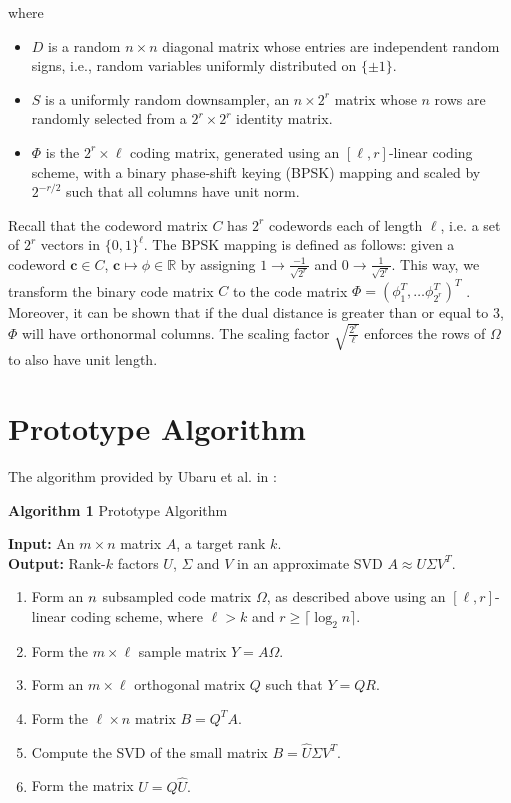 \documentclass[12pt]{article}
\newcommand{\tbf}{\textbf}
\newcommand{\mB}{\mathbb}
\begin{document}
where 
\begin{itemize}
\item $D$ is a random $n \times n$ diagonal matrix whose entries are independent random signs, i.e., random variables uniformly distributed on $\{ \pm 1 \}$.

\item $S$ is a uniformly random downsampler, an $n \times 2^r$ matrix whose $n$ rows are randomly selected from a $2^r \times 2^r$ identity matrix.

\item $\Phi$ is the $2^r \times \ell$ coding matrix, generated using an $[ \ell, r]$-linear coding scheme, with a binary phase-shift keying (BPSK) mapping and scaled by $2^{-r/2}$ such that all columns have unit norm.

\end{itemize}
Recall that the codeword matrix $C$ has $2^r$ codewords each of length $\ell$, i.e. a set of $2^r$ vectors in $\{0,1\}^{\ell}$. The BPSK mapping is defined as follows: given a codeword $\tbf{c} \in C$, $\tbf{c} \mapsto \phi \in \mB{R}$ by assigning $1 \rightarrow \frac{-1}{\sqrt{2^r}}$ and $0 \rightarrow \frac{1}{\sqrt{2^r}}$. This way, we transform the binary code matrix $C$ to the code matrix $\Phi = (\phi_1^T,  \hdots \phi_{2^r}^T) ^T$ \cite{ubaru2015low}. Moreover, it can be shown that if the dual distance is greater than or equal to 3, $\Phi$ will have orthonormal columns. The scaling factor $\sqrt{\frac{2^r}{\ell}}$ enforces the rows of $\Omega$ to also have unit length.


\section{Prototype Algorithm}
The algorithm provided by Ubaru et al. in \cite{ubaru2015low} :

\textbf{Algorithm 1} Prototype Algorithm \\
\vspace{4mm}

\textbf{Input:} An $m \times n$ matrix $A$, a target rank $k$. \\
\textbf{Output:} Rank-$k$ factors $U$, $\Sigma$ and $V$ in an approximate SVD $A \approx U \Sigma V^T$. 

\begin{enumerate}
 \item Form an $n \time \ell$ subsampled code matrix $\Omega$, as described above using an $[\ell,r]$-linear coding scheme, where $\ell > k$ and $r \ge \lceil \log_2 n \rceil.$ 

 \item Form the $m \times \ell$ sample matrix $Y = A\Omega$.
 \item Form an $m \times \ell$ orthogonal matrix $Q$ such that $Y = QR$. 
\item Form the $\ell \times n$ matrix $B = Q^T A$.
\item Compute the SVD of the small matrix $B = \hat{U} \Sigma V^T$.
\item Form the matrix $U = Q \hat{U}.$
\end{enumerate}
\end{document}
